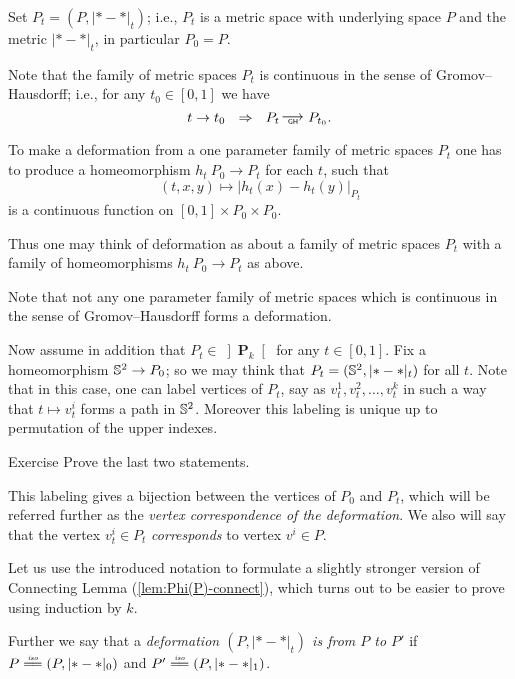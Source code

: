 Set $P_t=(P,|{*}-{*}|_t)$;
i.e., $P_t$ is a metric space with underlying space $P$ and the metric $|{*}-{*}|_t$, in particular $P_0=P$.  

Note that the family of metric spaces $P_t$ is continuous in the sense of Gromov--Hausdorff;
i.e., for any $t_0\in[0,1]$ we have 
$$t\to t_0\ \ \Rightarrow\ \ P_t\GHto P_{t_0}.$$

To make a deformation from
a one parameter family of metric spaces $P_t$  
one has to produce a homeomorphism 
$h_t\:P_0\to P_t$ for each $t$,
such that
$$(t,x,y)\mapsto |h_t(x)-h_t(y)|_{P_t}$$
is a continuous function on  $[0,1]\times P_0\times P_0$.

Thus one may think of deformation as about 
a family of metric spaces $P_t$ with a family of homeomorphisms $h_t\:P_0\to P_t$ as above.

Note that not any one parameter family of metric spaces which is continuous in the sense of Gromov--Hausdorff forms a deformation.

\medskip

Now assume in addition that $P_t\in\left]\mathbf{P}_k\right[$ 
for any $t\in [0,1]$.
Fix a homeomorphism $\mathbb{S}^2\to P_0$;
so we may think that $P_t=(\mathbb{S}^2,|{*}-{*}|_t)$ 
for all $t$.
Note that in this case, one can label vertices of $P_t$,
say as $v^1_t, v^2_t,\dots,v^k_t$
in such a way that $t\mapsto v^i_t$ forms a path in $\mathbb{S}^2$.
Moreover this labeling is unique up to permutation of the upper indexes.

\begin{thm}{Exercise}
Prove the last two statements. 
\end{thm}

This labeling gives a bijection between the vertices of $P_0$ and $P_t$, which will be referred further as the \emph{vertex correspondence of the deformation}.
We also will say that the vertex  $v^i_t\in P_t$
\emph{corresponds} to vertex $v^i\in P$.

\medskip

Let us use the introduced notation to formulate a slightly stronger version 
of Connecting Lemma (\ref{lem:Phi(P)-connect}), 
which turns out to be easier to prove using induction by $k$. 

Further we say that a 
\emph{deformation $(P,|{*}-{*}|_t)$ is from $P$ to $P'$}%
if $P\z\iso (P,|{*}-{*}|_0)$ 
and $P'\iso (P,|{*}-{*}|_1)$.
 


